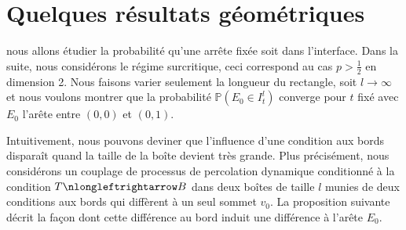 \documentclass[titlepage,a4paper,12pt]{article}
\newcounter{prop}
\newcounter{cor}
\begin{document}
\section{Quelques résultats géométriques}
nous allons étudier la probabilité qu'une arrête fixée soit dans l'interface. Dans la suite, nous considérons le régime surcritique, ceci correspond au cas $p>\frac{1}{2}$ en dimension 2. Nous faisons varier seulement la longueur du rectangle, soit $l \rightarrow \infty$ et nous voulons montrer que la probabilité $\mathbb{P}(E_0 \in I^l_t)$ converge pour $t$ fixé avec $E_0$ l'arête entre $(0,0)$ et $(0,1)$.

Intuitivement, nous pouvons deviner que l'influence d'une condition aux bords disparaît quand la taille de la boîte devient très grande. Plus précisément, nous considérons un couplage de processus de percolation dynamique conditionné à la condition $T\nlongleftrightarrow B$ dans deux boîtes de taille $l$ munies de deux conditions aux bords qui diffèrent à un seul sommet $v_0$. La proposition suivante décrit la façon dont cette différence au bord induit une différence à l'arête $E_0$.
\end{document}
